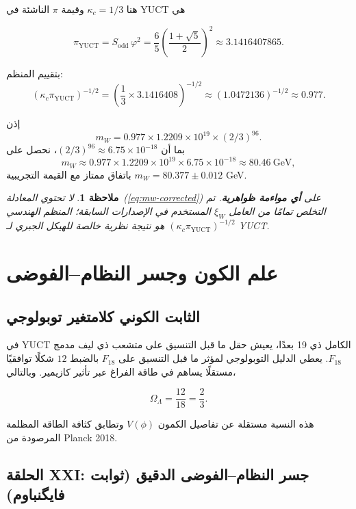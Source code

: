 \documentclass[11pt,a4paper]{article}
\newtheorem{remark}{ملاحظة}
\begin{document}
	هنا \(\kappa_c = 1/3\) وقيمة \(\pi\) الناشئة في YUCT هي
	
	\[
	\pi_{\mathrm{YUCT}} = S_{\mathrm{odd}} \, \varphi^2
	= \frac{6}{5} \left( \frac{1+\sqrt{5}}{2} \right)^2
	\approx 3.1416407865.
	\]
	
	بتقييم المنظم:
	\[
	\left( \kappa_c \pi_{\mathrm{YUCT}} \right)^{-1/2}
	= \left( \frac{1}{3} \times 3.1416408 \right)^{-1/2}
	\approx (1.0472136)^{-1/2} \approx 0.977.
	\]
	
	إذن
	\[
	m_W = 0.977 \times 1.2209 \times 10^{19} \times (2/3)^{96}.
	\]
	بما أن \((2/3)^{96} \approx 6.75 \times 10^{-18}\)، نحصل على
	\[
	m_W \approx 0.977 \times 1.2209 \times 10^{19} \times 6.75 \times 10^{-18}
	\approx 80.46\ \text{GeV},
	\]
	باتفاق ممتاز مع القيمة التجريبية \(m_W = 80.377 \pm 0.012\) GeV.
	
	\begin{remark}
		لا تحتوي المعادلة~(\ref{eq:mw-corrected}) على \textbf{أي مواءمة ظواهرية}. تم التخلص تمامًا من العامل \(\xi_W\) المستخدم في الإصدارات السابقة؛ المنظم الهندسي \((\kappa_c\pi_{\mathrm{YUCT}})^{-1/2}\) هو نتيجة نظرية خالصة للهيكل الجبري لـ YUCT.
	\end{remark}
	
	\section{علم الكون وجسر النظام--الفوضى}
	\label{sec:cosmology}
	
	\subsection{الثابت الكوني كلامتغير توبولوجي}
	
	في YUCT الكامل ذي 19 بعدًا، يعيش حقل ما قبل التنسيق على متشعب ذي ليف مدمج \(F_{18}\). يعطي الدليل التوبولوجي لمؤثر ما قبل التنسيق على \(F_{18}\) بالضبط \(12\) شكلًا توافقيًا مستقلًا يساهم في طاقة الفراغ عبر تأثير كازيمير. وبالتالي،
	
	\begin{equation}
		\boxed{\Omega_\Lambda = \frac{12}{18} = \frac{2}{3}}.
		\label{eq:OmegaLambda}
	\end{equation}
	
	هذه النسبة مستقلة عن تفاصيل الكمون \(V(\phi)\) وتطابق كثافة الطاقة المظلمة المرصودة من Planck 2018.
	
	\subsection{الحلقة XXI: جسر النظام–الفوضى الدقيق (ثوابت فايگنباوم)}
	
\end{document}
